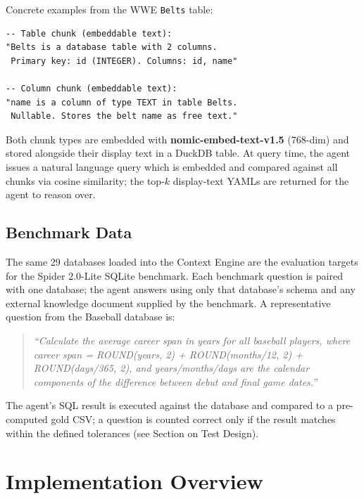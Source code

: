 Concrete examples from the WWE \texttt{Belts} table:

\begingroup\small
\begin{verbatim}
-- Table chunk (embeddable text):
"Belts is a database table with 2 columns.
 Primary key: id (INTEGER). Columns: id, name"

-- Column chunk (embeddable text):
"name is a column of type TEXT in table Belts.
 Nullable. Stores the belt name as free text."
\end{verbatim}
\endgroup

Both chunk types are embedded with \textbf{nomic-embed-text-v1.5} (768-dim) and stored alongside their display text in a DuckDB table. At query time, the agent issues a natural language query which is embedded and compared against all chunks via cosine similarity; the top-$k$ display-text YAMLs are returned for the agent to reason over.

\subsection{Benchmark Data}

The same 29 databases loaded into the Context Engine are the evaluation targets for the Spider 2.0-Lite SQLite benchmark. Each benchmark question is paired with one database; the agent answers using only that database's schema and any external knowledge document supplied by the benchmark. A representative question from the Baseball database is:

\begin{quote}
\textit{``Calculate the average career span in years for all baseball players, where career span = ROUND(years, 2) + ROUND(months/12, 2) + ROUND(days/365, 2), and years/months/days are the calendar components of the difference between debut and final game dates.''}
\end{quote}

The agent's SQL result is executed against the database and compared to a pre-computed gold CSV; a question is counted correct only if the result matches within the defined tolerances (see Section on Test Design).

\section{Implementation Overview} \label{sec:design_sec4}


